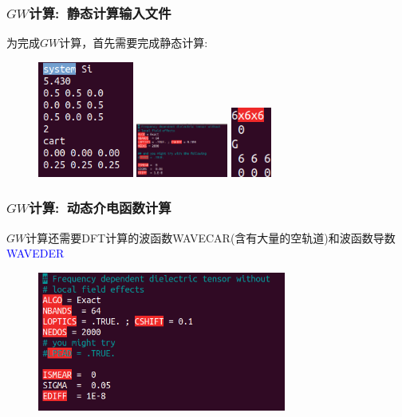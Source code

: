 \frame
{
	\frametitle{$GW$计算:~静态计算输入文件}
	为完成$GW$计算，首先需要完成静态计算:%
\begin{figure}[h!]
\centering
\includegraphics[height=1.5in,viewport=0 10 160 210,clip]{Figures/Si-GW-POSCAR.png}
\includegraphics[height=0.7in,viewport=0 10 160 90,clip]{Figures/SiC-optic-INCAR.png}
\includegraphics[height=0.9in,viewport=0 0 100 106,clip]{Figures/SiC-optic-KPOINTS.png}
\caption{\fontsize{5.8pt}{5.2pt}}%
\label{Si-GW-Input}
\end{figure}
}

\frame
{
	\frametitle{$GW$计算:~动态介电函数计算}
	$GW$计算还需要\textrm{DFT}计算的波函数\textrm{WAVECAR(含有大量的空轨道)}和波函数导数\textcolor{blue}{\textrm{WAVEDER}}
\vskip 5pt
{\fontsize{7.5pt}{5.2pt}\selectfont{计算与光学动态介电函数的计算类似}}%
\begin{figure}[h!]
	\vskip -2pt
\centering
\includegraphics[height=1.8in,viewport=0 10 490 285,clip]{Figures/Si-GW-DFT-INCAR.png}
\caption{\fontsize{6.2pt}{5.2pt}}%
\label{Si-GW-DFT-INCAR}
\end{figure}
}


